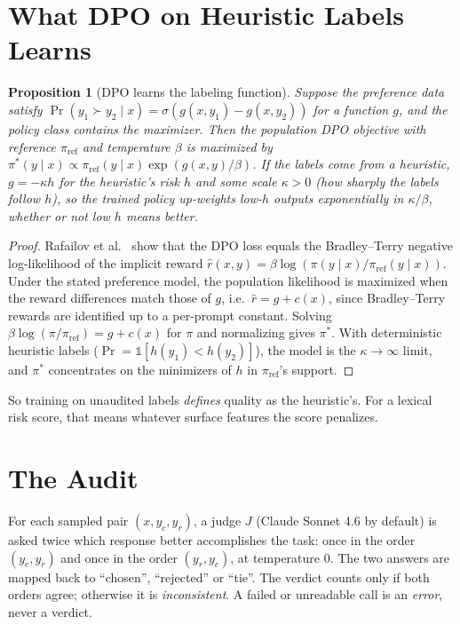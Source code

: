\documentclass[conference]{IEEEtran}
\newtheorem{proposition}{Proposition}
\theoremstyle{remark}
\begin{document}
\section{What DPO on Heuristic Labels Learns}\label{sec:dpo}
\begin{proposition}[DPO learns the labeling function]\label{prop:dpo}
Suppose the preference data satisfy $\Pr(y_1\succ y_2\mid x)=\sigma(g(x,y_1)-g(x,y_2))$ for a function $g$, and the policy class contains the maximizer. Then the population DPO objective with reference $\pi_{\mathrm{ref}}$ and temperature $\beta$ is maximized by $\pi^*(y\mid x)\propto\pi_{\mathrm{ref}}(y\mid x)\exp(g(x,y)/\beta)$. If the labels come from a heuristic, $g=-\kappa h$ for the heuristic's risk $h$ and some scale $\kappa>0$ (how sharply the labels follow $h$), so the trained policy up-weights low-$h$ outputs exponentially in $\kappa/\beta$, whether or not low $h$ means better.
\end{proposition}
\begin{proof}
Rafailov et al.~\cite{rafailov2023} show that the DPO loss equals the Bradley--Terry negative log-likelihood of the implicit reward $\hat r(x,y)=\beta\log(\pi(y\mid x)/\pi_{\mathrm{ref}}(y\mid x))$. Under the stated preference model, the population likelihood is maximized when the reward differences match those of $g$, i.e.\ $\hat r=g+c(x)$, since Bradley--Terry rewards are identified up to a per-prompt constant. Solving $\beta\log(\pi/\pi_{\mathrm{ref}})=g+c(x)$ for $\pi$ and normalizing gives $\pi^*$. With deterministic heuristic labels ($\Pr=\mathbb 1[h(y_1)<h(y_2)]$), the model is the $\kappa\to\infty$ limit, and $\pi^*$ concentrates on the minimizers of $h$ in $\pi_{\mathrm{ref}}$'s support.
\end{proof}
So training on unaudited labels \emph{defines} quality as the heuristic's. For a lexical risk score, that means whatever surface features the score penalizes.

\section{The Audit}\label{sec:audit}
For each sampled pair $(x,y_c,y_r)$, a judge $J$ (Claude Sonnet 4.6 by default) is asked twice which response better accomplishes the task: once in the order $(y_c,y_r)$ and once in the order $(y_r,y_c)$, at temperature 0. The two answers are mapped back to ``chosen'', ``rejected'' or ``tie''. The verdict counts only if both orders agree; otherwise it is \emph{inconsistent}. A failed or unreadable call is an \emph{error}, never a verdict.
\end{document}
